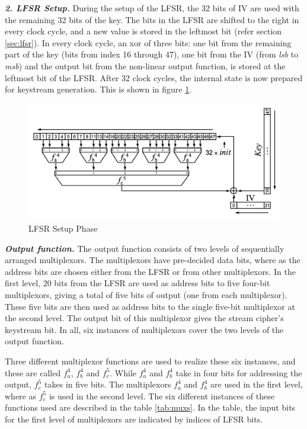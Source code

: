 \textit{\textbf{2. LFSR Setup.}} During the setup of the LFSR, the 32 bits of IV are used with the remaining 32 bits of the key. The bits in the LFSR are shifted to the right in every clock cycle, and a new value is stored in the leftmost bit (refer section \ref{sec:lfsr}). In every clock cycle, an xor of three bits: one bit from the remaining part of the key (bits from index 16 through 47), one bit from the IV (from \emph{lsb} to \emph{msb}) and the output bit from the non-linear output function, is stored at the leftmost bit of the LFSR. After 32 clock cycles, the internal state is now prepared for keystream generation. This is shown in figure \ref{fig:hitag2-2}.\\

\begin{figure}[ht!]
	\centering
		\includegraphics[width=5in]{./figures/hitag2-2.PNG}
	\caption{LFSR Setup Phase}	
	\label{fig:hitag2-2}
\end{figure}

\textit{\textbf{Output function.}} The output function consists of two levels of sequentially arranged multiplexors. The multiplexors have pre-decided data bits, where as the address bits are chosen either from the LFSR or from other multiplexors. In the first level, 20 bits from the LFSR are used as address bits to five four-bit multiplexors, giving a total of five bits of output (one from each multiplexor). These five bits are then used as address bits to the single five-bit multiplexor at the second level. The output bit of this multiplexor gives the stream cipher's keystream bit. In all, six instances of multiplexors cover the two levels of the output function.

Three different multiplexor functions are used to realize these six instances, and these are called $f_a^4$, $f_b^4$ and $f_c^5$. While $f_a^4$ and $f_b^4$ take in four bits for addressing the output, $f_c^5$ takes in five bits. The multiplexors $f_a^4$ and $f_b^4$ are used in the first level, where as $f_c^5$ is used in the second level. The six different instances of these functions used are described in the table \ref{tab:muxs}. In the table, the input bits for the first level of multiplexors are indicated by indices of LFSR bits.

